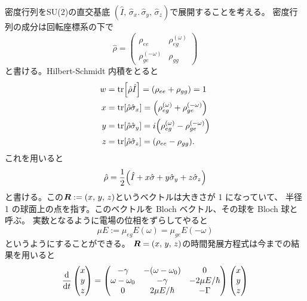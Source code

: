 \documentclass[11pt,dvipdfmx,a4paper]{jsarticle}
\begin{document}
密度行列をSU(2)の直交基底
\((\hat{I},\,\hat{\sigma}_x.\,\hat{\sigma}_y,\,\hat{\sigma}_z)\)で展開することを考える。
密度行列の成分は回転座標系の下で
\begin{equation}
	\hat{\rho} =
	\begin{pmatrix}
		\rho_{ee} & \rho_{eg}^{(\omega)}\\
		\rho_{ge}^{(-\omega)} & \rho_{gg}
	\end{pmatrix}
\end{equation}
と書ける。Hilbert-Schmidt 内積をとると
\begin{align}
	w &= \tr [\hat{\rho}\hat{I}]
	= \qty(\rho_{ee}+\rho_{gg}) = 1\\
	x &= \tr [\hat{\rho}\hat{\sigma}_x]
	= \qty(\rho_{eg}^{(\omega)}+\rho_{ge}^{(-\omega)})\\
	y &= \tr [\hat{\rho}\hat{\sigma}_y]
	= i\qty(\rho_{eg}^{(\omega)}-\rho_{ge}^{(-\omega)})\\
	z &= \tr [\hat{\rho}\hat{\sigma}_z]
	= \qty(\rho_{ee}-\rho_{gg}).
\end{align}
これを用いると
\begin{equation}
	\hat{\rho} = \frac{1}{2}\qty(\hat{I}+x\hat{\sigma}+y\hat{\sigma}_y+z\hat{\sigma}_z)
\end{equation}
と書ける。この\(\vb*{R} := (x,\,y,\,z)\)というベクトルは大きさが 1 になっていて、
半径 1 の球面上の点を指す。このベクトルを Bloch ベクトル、その球を Bloch 球と呼ぶ。
実数となるように電場の位相をずらしてやると
\begin{equation}
	\mu E := \mu_{eg}E(\omega) = \mu_{ge}E(-\omega)
\end{equation}
というようにすることができる。
\(\vb*{R} = (x,\,y,\,z)\)の時間発展方程式は今までの結果を用いると
\begin{equation}
	\dv{t}
	\begin{pmatrix}
		x\\ y\\ z
	\end{pmatrix}
	=
	\begin{pmatrix}
		-\gamma & -(\omega-\omega_0) & 0\\
		\omega -\omega_0 & -\gamma & -2\mu E/\hbar\\
		0 & 2\mu E/\hbar & -\Gamma
	\end{pmatrix}
	\begin{pmatrix}
		x\\ y\\ z
	\end{pmatrix}
\end{equation}
\end{document}
